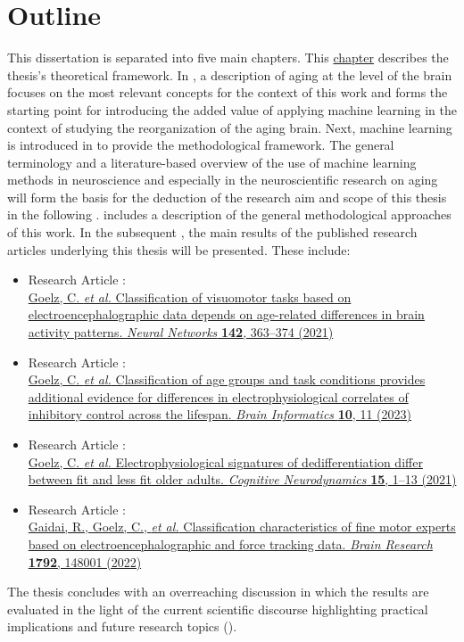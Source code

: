 \section{Outline}
This dissertation is separated into five main chapters. This \hyperref[chap:intro]{chapter} describes the thesis's theoretical framework. In , a description of aging at the level of the brain focuses on the most relevant concepts for the context of this work and forms the starting point for introducing the added value of applying machine learning in the context of studying the reorganization of the aging brain. Next, machine learning is introduced in  to provide the methodological framework. The general terminology and a literature-based overview of the use of machine learning methods in neuroscience and especially in the neuroscientific research on aging will form the basis for the deduction of the research aim and scope of this thesis in the following .  includes a description of the general methodological approaches of this work. In the subsequent , the main results of the published research articles underlying this thesis will be presented. These include:

\begin{itemize}
\item Research Article :\\ \hyperref[pub:paperI]{Goelz, C. \textit{et al.} Classification of visuomotor tasks based on electroencephalographic data depends on age-related differences in brain activity patterns. \textit{Neural Networks} \textbf{142}, 363--374 (2021)}
\newpage
\item Research Article :\\ \hyperref[pub:paperI]{Goelz, C. \textit{et al.} Classification of age groups and task conditions provides additional evidence for differences in electrophysiological correlates of inhibitory control across the lifespan. \textit{Brain Informatics} \textbf{10}, 11 (2023)}
\item Research Article :\\ \hyperref[pub:paperI]{Goelz, C. \textit{et al.} Electrophysiological signatures of dedifferentiation differ between fit and less fit older adults. \textit{Cognitive Neurodynamics} \textbf{15}, 1--13 (2021)}
\item Research Article :\\ \hyperref[pub:paperIV]{Gaidai, R., Goelz, C., \textit{et al.} Classification characteristics of fine motor experts based on electroencephalographic and force tracking data. \textit{Brain Research} \textbf{1792}, 148001 (2022)}
\end{itemize}

\noindent The thesis concludes with an overreaching discussion in which the results are evaluated in the light of the current scientific discourse highlighting practical implications and future research topics (). 
